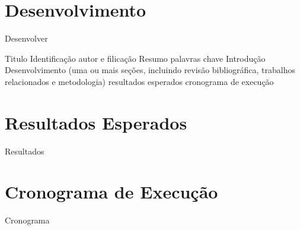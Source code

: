\documentclass[12pt]{article}
\begin{document}
\section{Desenvolvimento} \label{sec:firstpage}

Desenvolver

Titulo
Identificação autor e filicação
Resumo
palavras chave
Introdução
Desenvolvimento (uma ou mais seções, incluindo revisão bibliográfica, trabalhos relacionados e metodologia)
resultados esperados
cronograma de execução

\section{Resultados Esperados}

Resultados

\section{Cronograma de Execução}

Cronograma





\end{document}
